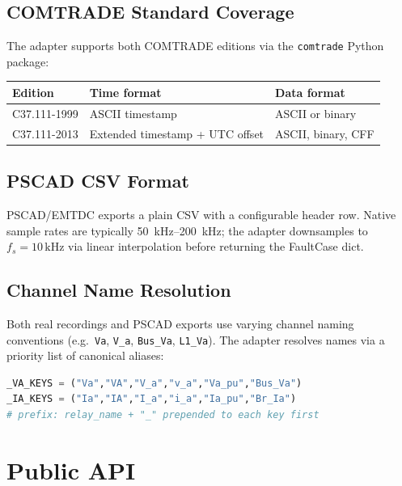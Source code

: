 \documentclass[11pt,a4paper]{article}
\begin{document}
\subsection{COMTRADE Standard Coverage}

The adapter supports both COMTRADE editions via the \texttt{comtrade}
Python package:

\begin{center}
\begin{tabular}{lll}
\toprule
Edition & Time format & Data format \\
\midrule
C37.111-1999 & ASCII timestamp & ASCII or binary \\
C37.111-2013 & Extended timestamp + UTC offset & ASCII, binary, CFF \\
\bottomrule
\end{tabular}
\end{center}

\subsection{PSCAD CSV Format}

PSCAD/EMTDC exports a plain CSV with a configurable header row.
Native sample rates are typically 50~kHz–200~kHz; the adapter
downsamples to $f_s = 10\,\text{kHz}$ via linear interpolation before
returning the FaultCase dict.

\subsection{Channel Name Resolution}

Both real recordings and PSCAD exports use varying channel naming
conventions (e.g.\ \texttt{Va}, \texttt{V\_a}, \texttt{Bus\_Va},
\texttt{L1\_Va}).  The adapter resolves names via a priority list of
canonical aliases:

\begin{lstlisting}[language=Python,caption={Alias resolution (excerpt)}]
_VA_KEYS = ("Va","VA","V_a","v_a","Va_pu","Bus_Va")
_IA_KEYS = ("Ia","IA","I_a","i_a","Ia_pu","Br_Ia")
# prefix: relay_name + "_" prepended to each key first
\end{lstlisting}

\section{Public API}
\label{sec:api}
\end{document}
